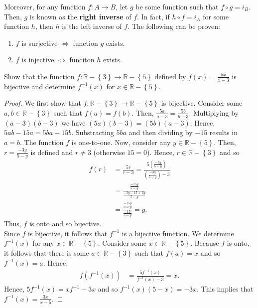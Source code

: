 \documentclass[12pt]{article}
\newcommand{\R}{\mathbb{R}}
\newenvironment{problem}[2][Problem]{\begin{trivlist} \item[\hskip \labelsep {\bfseries #1}\hskip \labelsep {\bfseries #2.}]}{\end{trivlist}}
\begin{document}
    Moreover, for any function $f:A\to B$, let $g$ be some function such that $f\circ g = i_{B}$. Then, $g$ is known as the \textbf{right inverse} of $f$. In fact, if $h\circ f= i_{A}$ for some function $h$, then $h$ is the left inverse of $f$. The following can be proven: 
    \begin{enumerate}
      \item $f$ is surjective $\iff$ function $g$ exists.
      \item $f$ is injective $\iff$ funciton $h$ exists.
    \end{enumerate}
    \begin{problem}{51}
      Show that the function $f:\R-\left\{ 3 \right\}\to \R-\left\{ 5 \right\}$ defined by $f(x) = \frac{5x}{x-3}$ is bijective and determine $f^{-1}(x)$ for $x\in \R-\left\{ 5 \right\}$.
    \begin{proof}
      We first show that $f:\R-\left\{ 3 \right\} \to \R-\left\{ 5 \right\}$ is bijective. Consider some $a,b\in \R-\left\{ 3 \right\}$ such that $f(a)=f(b)$. Then, $\frac{5a}{a-3}=\frac{5b}{b-3}$. Multiplying by $(a-3)(b-3)$ we have $(5a)(b-3) = (5b)(a-3)$. Hence, $5ab-15a = 5ba-15b$. Substracting $5ba$ and then dividing by $-15$ results in $a=b$. The function $f$ is one-to-one. Now, consider any $y\in \R-\left\{ 5 \right\}$. Then, $r=\frac{-3y}{5-y}$ is defined and $r\neq 3$ (otherwise $15=0$). Hence, $r\in \R-\left\{ 3 \right\}$ and so
    \begin{align*}
      f(r) &= \frac{5r}{r-3} = \frac{5\left( \frac{-3y}{5-y} \right)}{\left( \frac{-3y}{5-y} \right)-3}\\
      &= \frac{\frac{-15y}{5-y}}{\frac{-3y-15+3y}{5-y}} \\
      &= \frac{\frac{-15y}{5-y}}{\frac{-15}{5-y}}= y.
    \end{align*}
    Thus, $f$ is onto and so bijective. \\
    Since $f$ is bijective, it follows that $f^{-1}$ is a bijective function. We determine $f^{-1}(x)$ for any $x\in \R-\left\{ 5 \right\}$. Consider some $x\in \R-\left\{ 5 \right\}$. Because $f$ is onto, it follows that there is some $a\in \R-\left\{ 3 \right\}$ such that $f(a)=x$ and so $f^{-1}(x) = a$. Hence,
    \begin{align*}
      f\left( f^{-1}(x) \right) &= \frac{5f^{-1}(x)}{f^{-1}(x)-3} = x.
    \end{align*}
    Hence, $5f^{-1}(x) = xf^{-1}-3x$ and so $f^{-1}(x)(5-x) = -3x$. This implies that $f^{-1}(x) = \frac{3x}{x-5}$.
    \end{proof}
    \end{problem}


       
\end{document}
